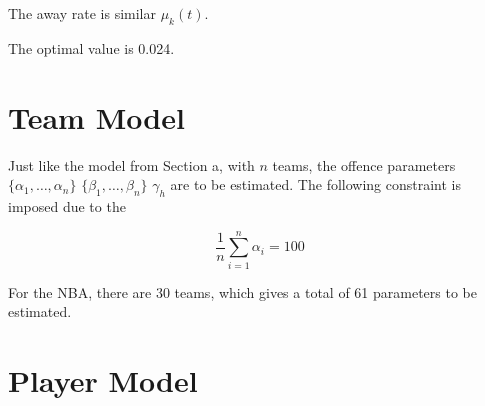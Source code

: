 The away rate is similar $\mu_k(t)$.



The optimal value is 0.024.

\section{Team Model}

Just like the model from Section a, with $n$ teams, the offence parameters $\{\alpha_1,\ldots,\alpha_n\}$ $\{\beta_1,\ldots,\beta_n\}$ $\gamma_h$ are to be estimated.  The following constraint is imposed due to the 

$$\frac{1}{n}\sum^{n}_{i=1}\alpha_i = 100$$

For the NBA, there are 30 teams, which gives a total of 61 parameters to be estimated.

\section{Player Model}